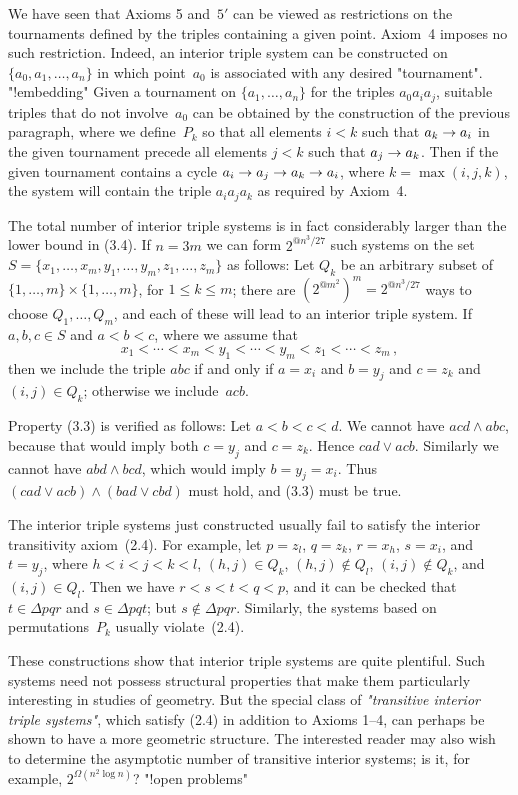 We have seen that Axioms 5 and~$5'$ can be viewed as restrictions on the
tournaments defined by the triples containing a given point. Axiom~4
imposes no such restriction. Indeed, an interior triple system can be
constructed on $\{a_0,a_1,\ldots,a_n\}$ in which point~$a_0$ is
associated with any desired "tournament". "!embedding"
Given a tournament on $\{a_1,\ldots,a_n\}$ for the triples
$a_0a_ia_j$, suitable
 triples that do not involve~$a_0$ can be obtained by the
construction of the previous paragraph, where we define~$P_k$ so that
all elements $i<k$ such that $a_k\rightarrow a_i$ in the given tournament
precede all elements $j<k$ such that $a_j\rightarrow a_k$. Then if the given
tournament contains a cycle $a_i\rightarrow a_j\rightarrow a_k\rightarrow a_i$, where
$k=\max(i,j,k)$, the system will contain the triple $a_ia_ja_k$ as
required by Axiom~4.

The total number of interior triple systems is in fact considerably
larger than the lower bound in (3.4).
If $n=3m$ we can form $2^{@n^3\!/27}$ such systems on
the set $S=\{x_1,\ldots,x_m,y_1,\ldots,y_m,z_1,\ldots,z_m\}$ as
follows: Let $Q_k$ be an arbitrary subset of $\{1,\ldots,m\}\times
\{1,\ldots,m\}$, for $1\leq k\leq m$; there are
$(2^{@m^2})^m=2^{@n^3\!/27}$ ways to choose $Q_1,\ldots,Q_m$, and each of
these will lead to an interior triple system. If $a,b,c\in S$ and
$a<b<c$, where we assume that 
$$x_1<\cdots<x_m<y_1<\cdots<y_m<z_1<\cdots<z_m\,,$$
then we include the triple $abc$ if and only if $a=x_i$ and $b=y_j$
and $c=z_k$ and $(i,j)\in Q_k$; otherwise we include~$acb$. 

Property (3.3) is verified as follows: Let $a<b<c<d$. We cannot have
$acd\wedge abc$, because that would imply both $c=y_j$ and $c=z_k$.
Hence $cad\vee acb$. Similarly we cannot have $abd\wedge bcd$, which
would imply $b=y_j=x_i$. Thus $(cad\vee acb)\wedge(bad\vee cbd)$ must
hold, and (3.3) must be true.

The interior triple systems just constructed usually fail to satisfy
the interior transitivity axiom~(2.4). For example, let $p=z_l$,
$q=z_k$, $r=x_h$, $s=x_i$, and $t=y_j$, where $h<i<j<k<l$, $(h,j)\in
Q_k$, $(h,j)\not\in Q_l$, $(i,j)\not\in Q_k$, and $(i,j)\in Q_l$. Then
we have $r<s<t<q<p$, and it can be checked that $t\in\Delta pqr$ and
$s\in\Delta pqt$; but $s\not\in\Delta pqr$. Similarly, the systems
based on permutations~$P_k$ usually violate~(2.4).

These constructions show that interior triple systems are quite
plentiful. Such systems need not possess structural properties that
make them particularly interesting in studies of geometry. But the
special class of {\it"transitive interior triple systems"}, which
satisfy (2.4) in addition to Axioms 1--4, can perhaps be shown to have
a more geometric structure. The interested reader may also wish to
determine the asymptotic number of transitive interior systems; is it,
for example, $2^{\Omega(n^2\log n)}$? "!open problems"

